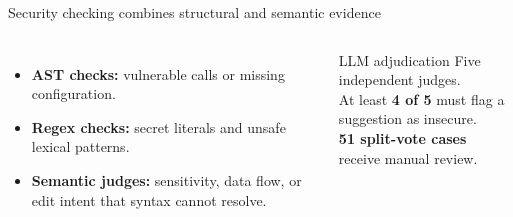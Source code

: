 \begin{frame}{Security checking combines structural and semantic evidence}
\begin{columns}[T]
\begin{itemize}
\item \textbf{AST checks:} vulnerable calls or missing configuration.
\item \textbf{Regex checks:} secret literals and unsafe lexical patterns.
\item \textbf{Semantic judges:} sensitivity, data flow, or edit intent that syntax cannot resolve.
\end{itemize}
\vspace{-5mm}
\begin{block}{LLM adjudication}
\small Five independent judges.\\[5pt]
At least \textbf{4 of 5} must flag a suggestion as insecure.\\[5pt]
\textbf{51 split-vote cases} receive manual review.
\end{block}
\end{columns}
\end{frame}

